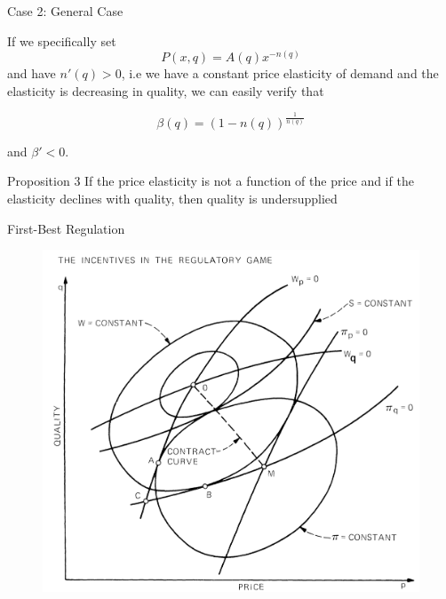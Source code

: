 \documentclass[10pt]{beamer}
\begin{document}
\begin{frame}{Case 2: General Case}


If we specifically set 
\begin{equation}
    P(x,q) = A(q)x^{-n(q)}
\end{equation}
and have $n'(q) >0$, i.e we have a constant price elasticity of demand and the elasticity is decreasing in quality, we can easily verify that

\begin{equation}
    \beta(q) = (1 - n(q) )^\frac{1}{n(q)} 
\end{equation}

and $\beta' < 0$.

\break

\begin{block}{Proposition 3}
If the price elasticity is not a function of the price and if the elasticity declines with quality, then quality is undersupplied
\end{block}
\end{frame}


\begin{frame}{First-Best Regulation}
\begin{figure}
    \centering
    \includegraphics[width = .8\textwidth]{spence3.png}
    \label{fig:3}
\end{figure}
    
\end{frame}
\end{document}

